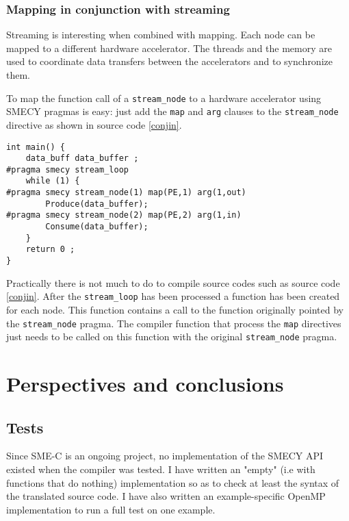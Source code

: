 \documentclass[a4paper]{article}
\begin{document}
	
	
	\subsubsection{Mapping in conjunction with streaming}
	Streaming is interesting when combined with mapping. Each node can be mapped to a different hardware accelerator. The threads and the memory are used to coordinate data transfers between the accelerators and to synchronize them.
	
	To map the function call of a \verb+stream_node+ to a hardware accelerator using SMECY pragmas is easy: just add the \verb+map+ and \verb+arg+ clauses to the \verb+stream_node+ directive as shown in source code \ref{conjin}.
		
	\begin{lstlisting}[label=conjin,caption={Input code with streaming and
mapping pragmas. The definitions of \texttt{Produce} and \texttt{Consume} functions are not shown.}]
int main() {
	data_buff data_buffer ;
#pragma smecy stream_loop
	while (1) {
#pragma smecy stream_node(1) map(PE,1) arg(1,out)
		Produce(data_buffer);
#pragma smecy stream_node(2) map(PE,2) arg(1,in)
		Consume(data_buffer);
	}
	return 0 ;
}
	\end{lstlisting}

 Practically there is not much to do to compile source codes such as source code \ref{conjin}. After the \verb+stream_loop+ has been processed a function has been created for each node. This function contains a call to the function originally pointed by the \verb+stream_node+ pragma. The compiler function that process the \verb+map+ directives just needs to be called on this function with the original \verb+stream_node+ pragma.

\section{Perspectives and conclusions}
	\subsection{Tests}
	Since SME-C is an ongoing project, no implementation of the SMECY API existed when the compiler was tested. I have written an "empty" (i.e with functions that do nothing) implementation so as to check at least the syntax of the translated source code. I have also written an example-specific OpenMP implementation to run a full test on one example.
	
\end{document}
